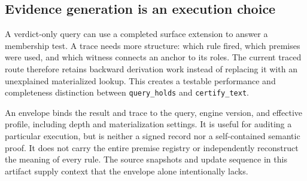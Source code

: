 \subsection{Evidence generation is an execution choice}

A verdict-only query can use a completed surface extension to answer a membership
test. A trace needs more structure: which rule fired, which premises were used,
and which witness connects an anchor to its roles. The current traced route
therefore retains backward derivation work instead of replacing it with an
unexplained materialized lookup. This creates a testable performance and
completeness distinction between \texttt{query\_holds} and \texttt{certify\_text}.

An envelope binds the result and trace to the query, engine version, and effective
profile, including depth and materialization settings. It is useful for auditing
a particular execution, but is neither a signed record nor a self-contained
semantic proof. It does not carry the entire premise registry or independently
reconstruct the meaning of every rule. The source snapshots and update sequence
in this artifact supply context that the envelope alone intentionally lacks.
